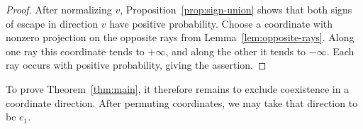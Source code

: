 \begin{proof}
After normalizing $v$, Proposition~\ref{prop:sign-union} shows that
both signs of escape in direction $v$ have positive probability.
Choose a coordinate with nonzero projection on the opposite rays
from Lemma~\ref{lem:opposite-rays}.  Along one ray this coordinate
tends to $+\infty$, and along the other it tends to $-\infty$.
Each ray occurs with positive probability, giving the assertion.
\end{proof}

To prove Theorem~\ref{thm:main}, it therefore remains to exclude
coexistence in a coordinate direction.  After permuting coordinates,
we may take that direction to be $e_1$.
